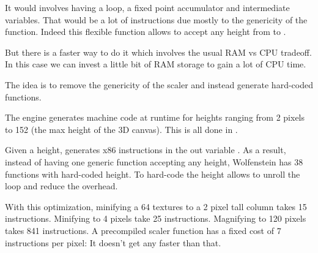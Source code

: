 \par
\begin{minipage}{\textwidth}

\end{minipage}

\par
It would involves having a loop, a fixed point accumulator and intermediate variables. That would be a lot of instructions due mostly to the genericity of the function. Indeed this flexible function allows  to accept any height from  to .\\
\par
 But there is a faster way to do it which involves the usual RAM vs CPU tradeoff. In this case we can invest a little bit of RAM storage to gain a lot of CPU time.\\
 \par 
 The idea is to remove the genericity of the scaler and instead generate hard-coded functions.\\
\par
\begin{minipage}{\textwidth}

\end{minipage}

 The engine generates machine code at runtime for heights ranging from 2 pixels to 152 (the max height of the 3D canvas). This is all done in .\\
\par
\begin{minipage}{\textwidth}

\end{minipage}
\par
Given a height,  generates x86 instructions in the out variable . As a result, instead of having one generic function accepting any height,  Wolfenstein has 38 functions with hard-coded height. To hard-code the height allows to unroll the loop and reduce the overhead.\\
\par
With this optimization, minifying a 64 textures to a 2 pixel tall column takes 15 instructions. Minifying to 4 pixels take 25 instructions. Magnifying to 120 pixels takes 841 instructions. A precompiled scaler function has a fixed cost of 7 instructions per pixel: It doesn't get any faster than that.\\

